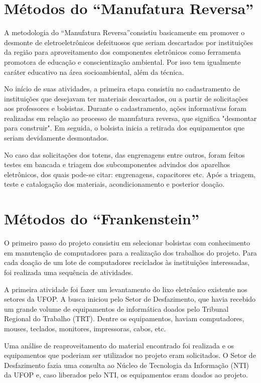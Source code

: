 \documentclass[
	12pt,				%
	openright,			%
	oneside,			%
	a4paper,			%
	english,			%
	spanish,			%
	brazil,				%
	]{abntex2}
\begin{document}
\section{Métodos do ``Manufatura Reversa''}
A metodologia do ``Manufatura Reversa''consistiu basicamente em promover o desmonte de eletroeletrônicos defeituosos que seriam descartados por instituições da região para aproveitamento dos componentes eletrônicos como ferramenta promotora de educação e conscientização ambiental. Por isso tem igualmente caráter educativo na área socioambiental, além da técnica.

No início de suas atividades, a primeira etapa consistiu no cadastramento de instituições que desejavam ter materiais descartados, ou a partir de solicitações aos professores e bolsistas. Durante o cadastramento, ações informativas foram realizadas em relação ao processo
de manufatura reversa, que significa "desmontar para construir". Em seguida, o bolsista inicia a retirada dos equipamentos que seriam devidamente desmontados.

No caso das solicitações dos totens, das engrenagens entre outros, foram feitos testes em bancada e triagem dos subcomponentes advindos dos aparelhos eletrônicos, dos quais pode-se citar: engrenagens, capacitores etc. Após a triagem, teste e catalogação dos materiais, acondicionamento e posterior doação.

\section{Métodos do ``Frankenstein''}
O primeiro passo do projeto consistiu em selecionar bolsistas com conhecimento em manutenção de computadores para a realização dos trabalhos do projeto.
Para cada doação de um lote de computadores reciclados às instituições interessadas, foi realizada uma sequência de atividades.

A primeira atividade foi fazer um levantamento do lixo eletrônico existente nos setores da UFOP. A busca iniciou pelo Setor de Desfazimento, que havia recebido um grande volume de equipamentos de informática doados pelo Tribunal Regional do Trabalho (TRT). Dentre os equipamentos, haviam computadores, mouses, teclados, monitores, impressoras, cabos, etc. 

Uma análise de reaproveitamento do material encontrado foi realizada e os equipamentos que poderiam ser utilizados no projeto eram solicitados. O Setor de Desfazimento fazia uma consulta ao Núcleo de Tecnologia da Informação (NTI) da UFOP e, caso liberados pelo NTI, os equipamentos eram doados ao projeto. 
\end{document}
